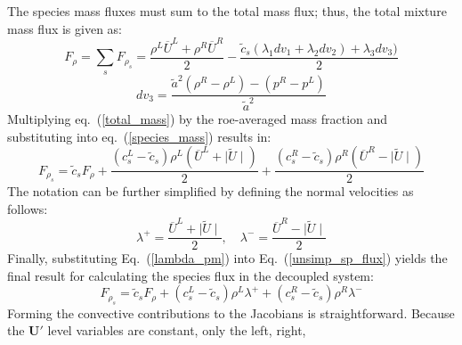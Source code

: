 \documentclass{article}   	%
\begin{document}
The species mass fluxes must sum to the total mass flux; thus, the total mixture
mass flux is given as:
\begin{equation}
\label{total_mass}
	F_\rho = \sum\limits_{s}{F_{\rho_s}} = \frac{\rho^L\overline{U}^L+\rho^R\overline{U}^R}{2}
	-\frac{\tilde{c}_s(\lambda_1 dv_1 + \lambda_2 dv_2)+\lambda_3 dv_3)}{2}
\end{equation}
\begin{equation}
	dv_3 = \frac{\tilde{a}^2 (\rho^R-\rho^L)-(p^R-p^L)}{\tilde{a}^2}
\end{equation}
Multiplying eq.~(\ref{total_mass}) by the roe-averaged mass fraction and
substituting into eq.~(\ref{species_mass}) results in:
\begin{equation}
\label{unsimp_sp_flux}
	F_{\rho_s} =\tilde{c}_s F_\rho + \frac{(c_s^L-\tilde{c}_s)\rho^L(\overline{U}^L+\mid \tilde{U}\mid)}{2}
	+ \frac{(c_s^R-\tilde{c}_s)\rho^R(\overline{U}^R-\mid \tilde{U}\mid)}{2}
\end{equation}
The notation can be further simplified by defining the normal velocities as follows:
\begin{equation}
\label{lambda_pm}
	\lambda^+ = \frac{\overline{U}^L+\mid \tilde{U}\mid}{2}, \quad 
	\lambda^- = \frac{\overline{U}^R-\mid \tilde{U}\mid}{2}
\end{equation}
Finally, substituting Eq.~(\ref{lambda_pm}) into Eq.~(\ref{unsimp_sp_flux})
yields the final result for calculating the species flux in the decoupled
system:
\begin{equation}
\label{sp_flux}
	F_{\rho_s} =\tilde{c}_s F_\rho + (c_s^L-\tilde{c}_s)\rho^L\lambda^+
	+ (c_s^R-\tilde{c}_s)\rho^R\lambda^-
\end{equation}
Forming the convective contributions to the Jacobians is straightforward.
Because the $\mathbf{U}'$ level variables are constant, only the left, right,
\end{document}

